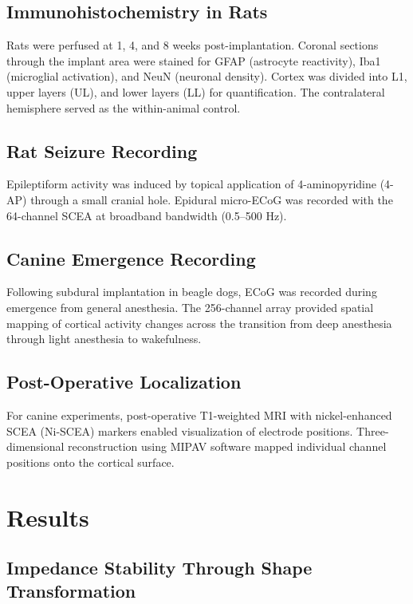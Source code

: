 \documentclass[11pt]{article}
\begin{document}
\subsection{Immunohistochemistry in Rats}

Rats were perfused at 1, 4, and 8 weeks post-implantation. Coronal sections through the implant area were stained for GFAP (astrocyte reactivity), Iba1 (microglial activation), and NeuN (neuronal density). Cortex was divided into L1, upper layers (UL), and lower layers (LL) for quantification. The contralateral hemisphere served as the within-animal control.

\subsection{Rat Seizure Recording}

Epileptiform activity was induced by topical application of 4-aminopyridine (4-AP) through a small cranial hole. Epidural micro-ECoG was recorded with the 64-channel SCEA at broadband bandwidth (0.5--500 Hz).

\subsection{Canine Emergence Recording}

Following subdural implantation in beagle dogs, ECoG was recorded during emergence from general anesthesia. The 256-channel array provided spatial mapping of cortical activity changes across the transition from deep anesthesia through light anesthesia to wakefulness.

\subsection{Post-Operative Localization}

For canine experiments, post-operative T1-weighted MRI with nickel-enhanced SCEA (Ni-SCEA) markers enabled visualization of electrode positions. Three-dimensional reconstruction using MIPAV software mapped individual channel positions onto the cortical surface.

\section{Results}

\subsection{Impedance Stability Through Shape Transformation}
\end{document}
